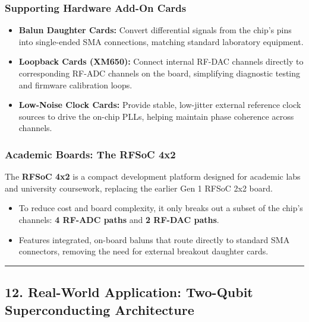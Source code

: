 \documentclass[
]{article}
\providecommand{\tightlist}{%
  \setlength{\itemsep}{0pt}\setlength{\parskip}{0pt}}
\begin{document}
\subsubsection{Supporting Hardware Add-On
Cards}\label{supporting-hardware-add-on-cards}

\begin{itemize}
\tightlist
\item
  \textbf{Balun Daughter Cards:} Convert differential signals from the
  chip's pins into single-ended SMA connections, matching standard
  laboratory equipment.
\item
  \textbf{Loopback Cards (XM650):} Connect internal RF-DAC channels
  directly to corresponding RF-ADC channels on the board, simplifying
  diagnostic testing and firmware calibration loops.
\item
  \textbf{Low-Noise Clock Cards:} Provide stable, low-jitter external
  reference clock sources to drive the on-chip PLLs, helping maintain
  phase coherence across channels.
\end{itemize}

\subsubsection{Academic Boards: The RFSoC
4x2}\label{academic-boards-the-rfsoc-4x2}

The \textbf{RFSoC 4x2} is a compact development platform designed for
academic labs and university coursework, replacing the earlier Gen 1
RFSoC 2x2 board.

\begin{itemize}
\tightlist
\item
  To reduce cost and board complexity, it only breaks out a subset of
  the chip's channels: \textbf{4 RF-ADC paths} and \textbf{2 RF-DAC
  paths}.
\item
  Features integrated, on-board baluns that route directly to standard
  SMA connectors, removing the need for external breakout daughter
  cards.
\end{itemize}

\begin{center}\rule{0.5\linewidth}{0.5pt}\end{center}

\subsection{12. Real-World Application: Two-Qubit Superconducting
Architecture}\label{real-world-application-two-qubit-superconducting-architecture}
\end{document}
